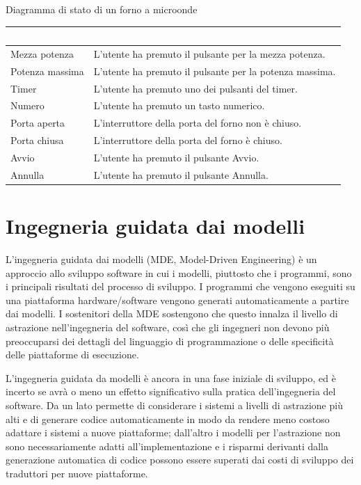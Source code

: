 \begin{Example}{Diagramma di stato di un forno a microonde}{}
\vspace{0.1cm}
\begin{minipage}{\textwidth}
\begin{tabular}{|p{3cm}|p{10.5cm}|}
\hline
\rowcolor{headerblue}
\textbf{\textcolor{white}{Stimolo}} & \textbf{\textcolor{white}{Descrizione}} \\\hline
Mezza potenza & L'utente ha premuto il pulsante per la mezza potenza.\\\hline
Potenza massima & L'utente ha premuto il pulsante per la potenza massima.\\\hline
Timer & L'utente ha premuto uno dei pulsanti del timer.\\\hline
Numero & L'utente ha premuto un tasto numerico.\\\hline
Porta aperta & L'interruttore della porta del forno non è chiuso.\\\hline
Porta chiusa & L'interruttore della porta del forno è chiuso.\\\hline
Avvio & L'utente ha premuto il pulsante Avvio.\\\hline
Annulla & L'utente ha premuto il pulsante Annulla.\\\hline
\end{tabular}
\end{minipage}
\end{Example}


\section{Ingegneria guidata dai modelli}
L’ingegneria guidata dai modelli (MDE, Model-Driven Engineering) è un approccio allo sviluppo software in cui i modelli, piuttosto che i programmi, sono i principali risultati del processo di sviluppo. I programmi che vengono eseguiti su una piattaforma hardware/software vengono generati automaticamente a partire dai modelli. I sostenitori della MDE sostengono che questo innalza il livello di astrazione nell'ingegneria del software, così che gli ingegneri non devono più preoccuparsi dei dettagli del linguaggio di programmazione o delle specificità delle piattaforme di esecuzione.

L'ingegneria guidata da modelli è ancora in una fase iniziale di sviluppo, ed è incerto se avrà o meno un effetto significativo sulla pratica dell'ingegneria del software. Da un lato permette di considerare i sistemi a livelli di astrazione più alti e di generare codice automaticamente in modo da rendere meno costoso adattare i sistemi a nuove piattaforme; dall'altro i modelli per l'astrazione non sono necessariamente adatti all'implementazione e i risparmi derivanti dalla generazione automatica di codice possono essere superati dai costi di sviluppo dei traduttori per nuove piattaforme.

